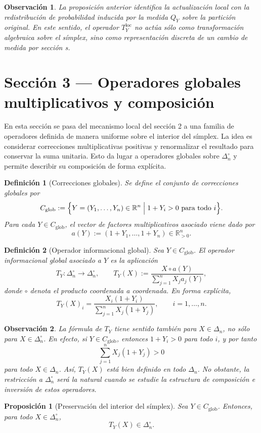 \documentclass[12pt]{article}
\newtheorem{definicion}{Definición}[section]
\newtheorem{proposicion}{Proposición}[section]
\newtheorem{observacion}{Observación}[section]
\begin{document}
\begin{observacion}
La proposición anterior identifica la actualización local con la redistribución de probabilidad inducida por la medida $Q_Y$ sobre la partición original. En este sentido, el operador $T_Y^{\mathrm{loc}}$ no actúa sólo como transformación algebraica sobre el símplex, sino como representación discreta de un cambio de medida por sección s.
\end{observacion}
\section{Sección 3 — Operadores globales multiplicativos y composición}

En esta sección  se pasa del mecanismo local del sección 2 a una familia de operadores definida de manera uniforme sobre el interior del símplex. La idea es considerar correcciones multiplicativas positivas y renormalizar el resultado para conservar la suma unitaria. Esto da lugar a operadores globales sobre $\Delta_n^\circ$ y permite describir su composición de forma explícita.

\begin{definicion}[Correcciones globales]\label{def:Cglob}
Se define el conjunto de \emph{correcciones globales} por
\[
C_{\mathrm{glob}}
:=
\Bigl\{
Y=(Y_1,\dots,Y_n)\in\mathbb{R}^n
\;\Big|\;
1+Y_i>0 \ \text{para todo } i
\Bigr\}.
\]
Para cada $Y\in C_{\mathrm{glob}}$, el vector de factores multiplicativos asociado viene dado por
\[
a(Y):=(1+Y_1,\dots,1+Y_n)\in\mathbb{R}_{>0}^n.
\]
\end{definicion}

\begin{definicion}[Operador informacional global]\label{def:Tglobal}
Sea $Y\in C_{\mathrm{glob}}$. El \emph{operador informacional global} asociado a $Y$ es la aplicación
\[
T_Y:\Delta_n^\circ\to\Delta_n^\circ,
\qquad
T_Y(X)
:=
\frac{X\circ a(Y)}{\sum_{j=1}^n X_j a_j(Y)},
\]
donde $\circ$ denota el producto coordenada a coordenada. En forma explícita,
\[
T_Y(X)_i
=
\frac{X_i(1+Y_i)}{\sum_{j=1}^n X_j(1+Y_j)},
\qquad i=1,\dots,n.
\]
\end{definicion}

\begin{observacion}\label{obs:Tglobal-frontera}
La fórmula de $T_Y$ tiene sentido también para $X\in\Delta_n$, no sólo para $X\in\Delta_n^\circ$. En efecto, si $Y\in C_{\mathrm{glob}}$, entonces $1+Y_i>0$ para todo $i$, y por tanto
\[
\sum_{j=1}^n X_j(1+Y_j)>0
\]
para todo $X\in\Delta_n$. Así, $T_Y(X)$ está bien definido en todo $\Delta_n$. No obstante, la restricción a $\Delta_n^\circ$ será la natural cuando se estudie la estructura de composición e inversión de estos operadores.
\end{observacion}
\begin{proposicion}[Preservación del interior del símplex]\label{prop:interiorGlobal}
Sea $Y\in C_{\mathrm{glob}}$. Entonces, para todo $X\in\Delta_n^\circ$,
\[
T_Y(X)\in\Delta_n^\circ.
\]
\end{proposicion}
\end{document}
